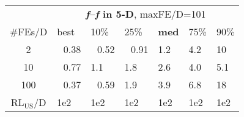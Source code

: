\begin{tabular}{c|llllll}
 & \multicolumn{6}{|c}{\textbf{\textit{f}\raisebox{-0.35ex}{1}--\textit{f}\raisebox{-0.35ex}{24} in 5-D}, maxFE/D=101}\\
\#FEs/D & best & 10\% & 25\% & \textbf{med} & 75\% & 90\%\\
2 & ~\,0.38 & ~\,0.52 & ~\,0.91 & \hspace*{1ex}1.2 & \hspace*{1ex}4.2 & 10\\
10 & ~\,0.77 & \hspace*{1ex}1.1 & \hspace*{1ex}1.8 & \hspace*{1ex}2.6 & \hspace*{1ex}4.0 & \hspace*{1ex}5.1\\
100 & ~\,0.37 & ~\,0.59 & \hspace*{1ex}1.9 & \hspace*{1ex}3.9 & \hspace*{1ex}6.8 & 18\\
$\text{RL}_{\text{US}}$/D & 1e2 & 1e2 & 1e2 & 1e2 & 1e2 & 1e2
\end{tabular}
